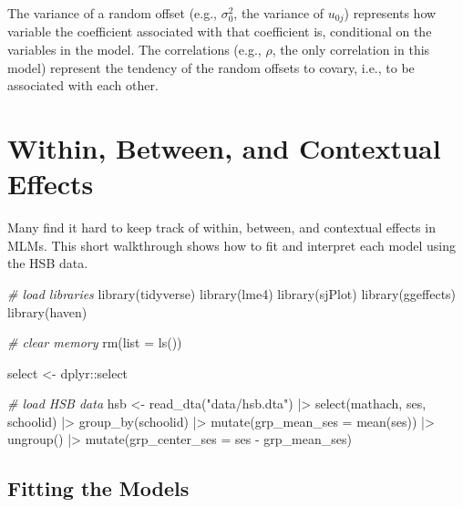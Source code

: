 \documentclass[
  letterpaper,
  DIV=11,
  numbers=noendperiod]{scrreprt}
\newenvironment{Shaded}{\begin{snugshade}}{\end{snugshade}}
\newcommand{\AttributeTok}[1]{\textcolor[rgb]{0.49,0.56,0.16}{#1}}
\newcommand{\CommentTok}[1]{\textcolor[rgb]{0.38,0.63,0.69}{\textit{#1}}}
\newcommand{\FunctionTok}[1]{\textcolor[rgb]{0.02,0.16,0.49}{#1}}
\newcommand{\NormalTok}[1]{\textcolor[rgb]{0.00,0.44,0.13}{#1}}
\newcommand{\OtherTok}[1]{\textcolor[rgb]{0.00,0.44,0.13}{#1}}
\newcommand{\SpecialCharTok}[1]{\textcolor[rgb]{0.25,0.44,0.63}{#1}}
\newcommand{\StringTok}[1]{\textcolor[rgb]{0.25,0.44,0.63}{#1}}
\begin{document}
The variance of a random offset (e.g., \(\sigma_0^2\), the variance of
\(u_{0j}\)) represents how variable the coefficient associated with that
coefficient is, conditional on the variables in the model. The
correlations (e.g., \(\rho\), the only correlation in this model)
represent the tendency of the random offsets to covary, i.e., to be
associated with each other.

\hypertarget{within-between-and-contextual-effects}{%
\chapter{Within, Between, and Contextual
Effects}\label{within-between-and-contextual-effects}}

Many find it hard to keep track of within, between, and contextual
effects in MLMs. This short walkthrough shows how to fit and interpret
each model using the HSB data.

\begin{Shaded}
\begin{Highlighting}[]
\CommentTok{\# load libraries}
\FunctionTok{library}\NormalTok{(tidyverse)}
\FunctionTok{library}\NormalTok{(lme4)}
\FunctionTok{library}\NormalTok{(sjPlot)}
\FunctionTok{library}\NormalTok{(ggeffects)}
\FunctionTok{library}\NormalTok{(haven)}

\CommentTok{\# clear memory}
\FunctionTok{rm}\NormalTok{(}\AttributeTok{list =} \FunctionTok{ls}\NormalTok{())}

\NormalTok{select }\OtherTok{\textless{}{-}}\NormalTok{ dplyr}\SpecialCharTok{::}\NormalTok{select}

\CommentTok{\# load HSB data}
\NormalTok{hsb }\OtherTok{\textless{}{-}} \FunctionTok{read\_dta}\NormalTok{(}\StringTok{"data/hsb.dta"}\NormalTok{) }\SpecialCharTok{|\textgreater{}} 
  \FunctionTok{select}\NormalTok{(mathach, ses, schoolid) }\SpecialCharTok{|\textgreater{}} 
  \FunctionTok{group\_by}\NormalTok{(schoolid) }\SpecialCharTok{|\textgreater{}} 
  \FunctionTok{mutate}\NormalTok{(}\AttributeTok{grp\_mean\_ses =} \FunctionTok{mean}\NormalTok{(ses)) }\SpecialCharTok{|\textgreater{}} 
  \FunctionTok{ungroup}\NormalTok{() }\SpecialCharTok{|\textgreater{}} 
  \FunctionTok{mutate}\NormalTok{(}\AttributeTok{grp\_center\_ses =}\NormalTok{ ses }\SpecialCharTok{{-}}\NormalTok{ grp\_mean\_ses)}
\end{Highlighting}
\end{Shaded}

\hypertarget{fitting-the-models}{%
\section{Fitting the Models}\label{fitting-the-models}}
\end{document}
